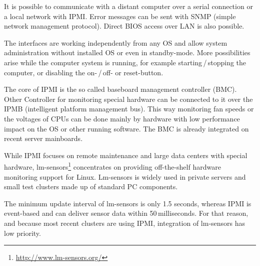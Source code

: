 It is possible to communicate with a distant computer over a serial connection or a local network with IPMI. Error messages can be sent with SNMP (simple network management protocol). Direct BIOS access over LAN is also possible.

The interfaces are working independently from any OS and allow system administration without installed OS or even in standby-mode. More possibilities arise while the computer system is running, for example starting\,/\,stopping the computer, or disabling the on-\,/\,off- or reset-button.

The core of IPMI is the so called baseboard management controller (BMC). Other Controller for monitoring special hardware can be connected to it over the IPMB (intelligent platform management bus). This way monitoring fan speeds or the voltages of CPUs can be done mainly by hardware with low performance impact on the OS or other running software.
The BMC is already integrated on recent server mainboards\cite{ipmi}.



\superpar
While IPMI focuses on remote maintenance and large data centers with special hardware, lm-sensors\footnote{\url{http://www.lm-sensors.org/}} concentrates on providing off-the-shelf hardware monitoring support for Linux. Lm-sensors is widely used in private servers and small test clusters made up of standard PC components.

The minimum update interval of lm-sensors is only 1.5 seconds, whereas IPMI is event-based and can deliver sensor data within 50\,milliseconds. For that reason, and because most recent clusters are using IPMI, integration of lm-sensors has low priority.